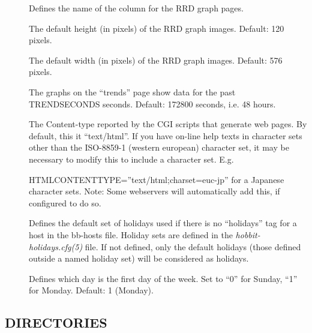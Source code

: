 \begin{description}
\item[] Defines the name of the column for the RRD graph pages. 

\item[] The default height (in pixels) of the RRD graph images. Default: 120 pixels. 

\item[] The default width (in pixels) of the RRD graph images. Default: 576 pixels. 

\item[] The graphs on the ``trends'' page show data for
  the past TRENDSECONDS seconds. Default: 172800 seconds, i.e. 48
  hours. 
 

\item[] The Content-type reported by the CGI scripts
  that generate web pages. By default, this it ``text/html''. If you
  have on-line help texts in character sets other than the ISO-8859-1
  (western european) character set, it may be necessary to modify this
  to include a character set. E.g.  

 
HTMLCONTENTTYPE=''text/html;charset=euc-jp''   for a Japanese
character sets. Note: Some webservers will automatically add this, if
configured to do so. 



\item[] Defines the default set of holidays used if there is
  no ``holidays'' tag for a host in the bb-hosts file. Holiday sets
  are defined in the \emph{hobbit-holidays.cfg(5)} file. If not
  defined, only the default holidays (those defined outside a named
  holiday set) will be considered as holidays. 



\item[] Defines which day is the first day of the week. Set
  to ``0'' for Sunday, ``1'' for Monday. Default: 1 (Monday). 
 

\end{description}

\subsection{DIRECTORIES}

